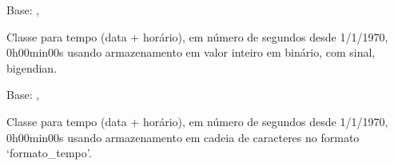 \documentclass[letterpaper,10pt,brazil]{sphinxmanual}
\begin{document}

\begin{fulllineitems}
\label{\detokenize{estrutarq.campo:estrutarq.campo.campo_tempo.CampoTempoBinario}}
\pysigstartsignatures
{}
\pysigstopsignatures
\sphinxAtStartPar
Base: {\hyperref[\detokenize{estrutarq.dado:estrutarq.dado.DadoBinario}]{}}, {\hyperref[\detokenize{estrutarq.campo:estrutarq.campo.campo_tempo.CampoTempoBasicoBinario}]{}}

\sphinxAtStartPar
Classe para tempo (data + horário), em número de segundos desde 1/1/1970,
0h00min00s usando armazenamento em valor inteiro em binário, com sinal,
big\sphinxhyphen{}endian.

\end{fulllineitems}


\begin{fulllineitems}
\label{\detokenize{estrutarq.campo:estrutarq.campo.campo_tempo.CampoTempoFixo}}
\pysigstartsignatures
{}
\pysigstopsignatures
\sphinxAtStartPar
Base: {\hyperref[\detokenize{estrutarq.dado:estrutarq.dado.DadoFixo}]{}}, {\hyperref[\detokenize{estrutarq.campo:estrutarq.campo.campo_tempo.CampoTempoBasicoFixo}]{}}

\sphinxAtStartPar
Classe para tempo (data + horário), em número de segundos desde 1/1/1970,
0h00min00s usando armazenamento em cadeia de caracteres no formato
‘formato\_tempo’.

\end{fulllineitems}
\end{document}

